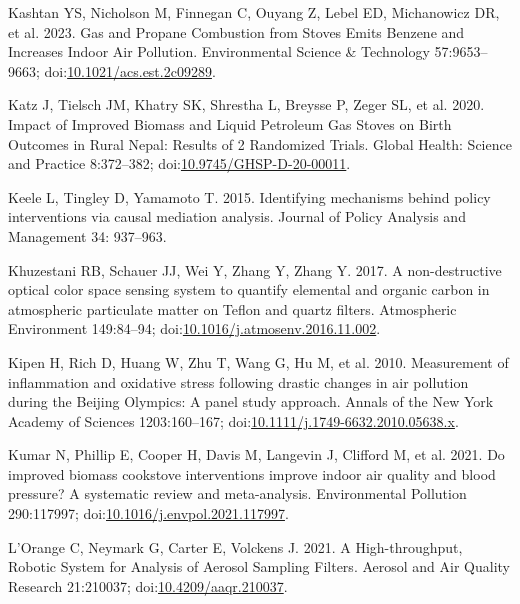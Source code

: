 \documentclass[
  letterpaper,
  DIV=11,
  numbers=noendperiod]{scrartcl}
\newlength{\cslhangindent}
\newenvironment{CSLReferences}[2] %
 {\begin{list}{}{%
  \setlength{\itemindent}{0pt}
  \setlength{\leftmargin}{0pt}
  \setlength{\parsep}{0pt}
  \ifodd #1
   \setlength{\leftmargin}{\cslhangindent}
   \setlength{\itemindent}{-1\cslhangindent}
  \fi
  \setlength{\itemsep}{#2\baselineskip}}}
 {\end{list}}
\begin{document}
\begin{CSLReferences}{1}{1}
Kashtan YS, Nicholson M, Finnegan C, Ouyang Z, Lebel ED, Michanowicz DR,
et al. 2023. Gas and {Propane Combustion} from {Stoves Emits Benzene}
and {Increases Indoor Air Pollution}. Environmental Science \&
Technology 57:9653--9663;
doi:\href{https://doi.org/10.1021/acs.est.2c09289}{10.1021/acs.est.2c09289}.

Katz J, Tielsch JM, Khatry SK, Shrestha L, Breysse P, Zeger SL, et al.
2020. Impact of {Improved Biomass} and {Liquid Petroleum Gas Stoves} on
{Birth Outcomes} in {Rural Nepal}: {Results} of 2 {Randomized Trials}.
Global Health: Science and Practice 8:372--382;
doi:\href{https://doi.org/10.9745/GHSP-D-20-00011}{10.9745/GHSP-D-20-00011}.

Keele L, Tingley D, Yamamoto T. 2015. Identifying mechanisms behind
policy interventions via causal mediation analysis. Journal of Policy
Analysis and Management 34: 937--963.

Khuzestani RB, Schauer JJ, Wei Y, Zhang Y, Zhang Y. 2017. A
non-destructive optical color space sensing system to quantify elemental
and organic carbon in atmospheric particulate matter on {Teflon} and
quartz filters. Atmospheric Environment 149:84--94;
doi:\href{https://doi.org/10.1016/j.atmosenv.2016.11.002}{10.1016/j.atmosenv.2016.11.002}.

Kipen H, Rich D, Huang W, Zhu T, Wang G, Hu M, et al. 2010. Measurement
of inflammation and oxidative stress following drastic changes in air
pollution during the {Beijing Olympics}: A panel study approach. Annals
of the New York Academy of Sciences 1203:160--167;
doi:\href{https://doi.org/10.1111/j.1749-6632.2010.05638.x}{10.1111/j.1749-6632.2010.05638.x}.

Kumar N, Phillip E, Cooper H, Davis M, Langevin J, Clifford M, et al.
2021. Do improved biomass cookstove interventions improve indoor air
quality and blood pressure? {A} systematic review and meta-analysis.
Environmental Pollution 290:117997;
doi:\href{https://doi.org/10.1016/j.envpol.2021.117997}{10.1016/j.envpol.2021.117997}.

L'Orange C, Neymark G, Carter E, Volckens J. 2021. A {High-throughput},
{Robotic System} for {Analysis} of {Aerosol Sampling Filters}. Aerosol
and Air Quality Research 21:210037;
doi:\href{https://doi.org/10.4209/aaqr.210037}{10.4209/aaqr.210037}.


\end{CSLReferences}
\end{document}
